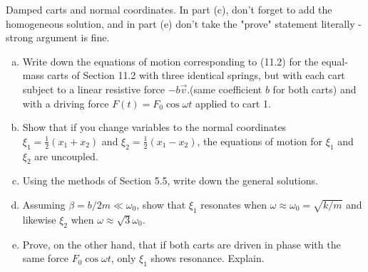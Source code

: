 \documentclass[11pt,letterpaper,boxed]{../hmcpsetrhino}
\newcommand{\half}{\frac{1}{2}}
\begin{document}
\newpage


\begin{problem}[iii]
Damped carts and normal coordinates. In part (c), don't forget to add the homogeneous solution, and in part (e) don't take the "prove" statement literally - strong argument is fine.

\begin{problem}[11.11]
\begin{enumerate}[(a)]
\item Write down the equations of motion corresponding to (11.2) for the equal-mass carts of Section 11.2 with three identical springs, but with each cart subject to a linear resistive force $-b\vec v$.(same coefficient $b$ for both carts) and with a driving force $F(t) = F_0 \cos \omega t$ applied to cart 1.

\item Show that if you change variables to the normal coordinates $\xi_1 = \half (x_1 + x_2)$ and $\xi_2 = \half (x_1 - x_2)$, the equations of motion for $\xi_1$ and $\xi_2$ are uncoupled.

\item Using the methods of Section 5.5, write down the general solutions. 

\item Assuming $\beta = b/2m \ll \omega_0$, show that $\xi_1$ resonates when $\omega \approx \omega_0 = \sqrt{k /m}$ and likewise $\xi_2$ when $\omega \approx \sqrt{3} \omega_0$. 

\item Prove, on the other hand, that if both carts are driven in phase with the same force $F_0 \cos \omega t$, only $\xi_1$ shows resonance. Explain.

\end{enumerate}
\end{problem}
\end{problem}
\begin{solution}


\vfill
\end{solution}

\newpage
\end{document}
